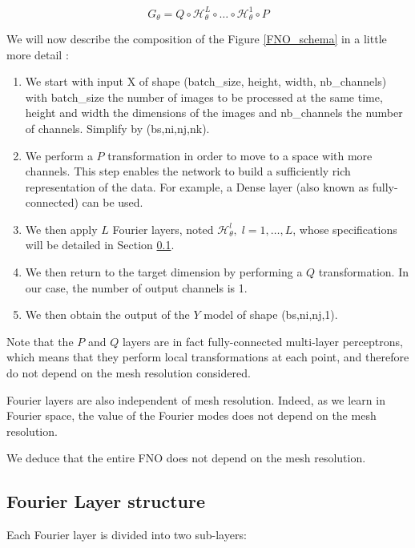 \begin{equation*}
	G_\theta = Q \circ \mathcal{H}_\theta^L \circ \dots \circ \mathcal{H}_\theta^1 \circ P
\end{equation*}

We will now describe the composition of the Figure \ref{FNO_schema} in a little more detail :
\begin{enumerate}[label=\textbullet]
	\item We start with input X of shape (batch\_size, height, width, nb\_channels) with batch\_size the number of images to be processed at the same time, height and width the dimensions of the images and nb\_channels the number of channels. Simplify by (bs,ni,nj,nk).
	\item We perform a $P$ transformation in order to move to a space with more channels. This step enables the network to build a sufficiently rich representation of the data.  For example, a Dense layer (also known as fully-connected) can be used. 	
	\item We then apply $L$ Fourier layers, noted $\mathcal{H}_\theta^l,\; l=1,\dots,L$, whose specifications will be detailed in Section \ref{FNO.fourierlayer}.
	\item We then return to the target dimension by performing a $Q$ transformation. In our case, the number of output channels is 1.
	\item We then obtain the output of the $Y$ model of shape (bs,ni,nj,1). 
\end{enumerate}

\begin{Rem}
	Note that the $P$ and $Q$ layers are in fact fully-connected multi-layer perceptrons, which means that they perform local transformations at each point, and therefore do not depend on the mesh resolution considered.
	
	Fourier layers are also independent of mesh resolution. Indeed, as we learn in Fourier space, the value of the Fourier modes does not depend on the mesh resolution.
	
	We deduce that the entire FNO does not depend on the mesh resolution.
\end{Rem}

\subsection{Fourier Layer structure} \label{FNO.fourierlayer}

Each Fourier layer is divided into two sub-layers:

